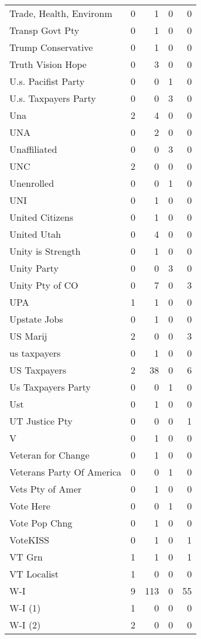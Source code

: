 \begin{supertabular}{lrrrr}
Trade, Health, Environm & 0 & 1 & 0 & 0\\
Transp Govt Pty & 0 & 1 & 0 & 0\\
Trump Conservative & 0 & 1 & 0 & 0\\
Truth Vision Hope & 0 & 3 & 0 & 0\\
U.s. Pacifist Party & 0 & 0 & 1 & 0\\
U.s. Taxpayers Party & 0 & 0 & 3 & 0\\
Una & 2 & 4 & 0 & 0\\
UNA & 0 & 2 & 0 & 0\\
Unaffiliated & 0 & 0 & 3 & 0\\
UNC & 2 & 0 & 0 & 0\\
Unenrolled & 0 & 0 & 1 & 0\\
UNI & 0 & 1 & 0 & 0\\
United Citizens & 0 & 1 & 0 & 0\\
United Utah & 0 & 4 & 0 & 0\\
Unity is Strength & 0 & 1 & 0 & 0\\
Unity Party & 0 & 0 & 3 & 0\\
Unity Pty of CO & 0 & 7 & 0 & 3\\
UPA & 1 & 1 & 0 & 0\\
Upstate Jobs & 0 & 1 & 0 & 0\\
US Marij & 2 & 0 & 0 & 3\\
us taxpayers & 0 & 1 & 0 & 0\\
US Taxpayers & 2 & 38 & 0 & 6\\
Us Taxpayers Party & 0 & 0 & 1 & 0\\
Ust & 0 & 1 & 0 & 0\\
UT Justice Pty & 0 & 0 & 0 & 1\\
V & 0 & 1 & 0 & 0\\
Veteran for Change & 0 & 1 & 0 & 0\\
Veterans Party Of America & 0 & 0 & 1 & 0\\
Vets Pty of Amer & 0 & 1 & 0 & 0\\
Vote Here & 0 & 0 & 1 & 0\\
Vote Pop Chng & 0 & 1 & 0 & 0\\
VoteKISS & 0 & 1 & 0 & 1\\
VT Grn & 1 & 1 & 0 & 1\\
VT Localist & 1 & 0 & 0 & 0\\
W-I & 9 & 113 & 0 & 55\\
W-I (1) & 1 & 0 & 0 & 0\\
W-I (2) & 2 & 0 & 0 & 0\\

\end{supertabular}
